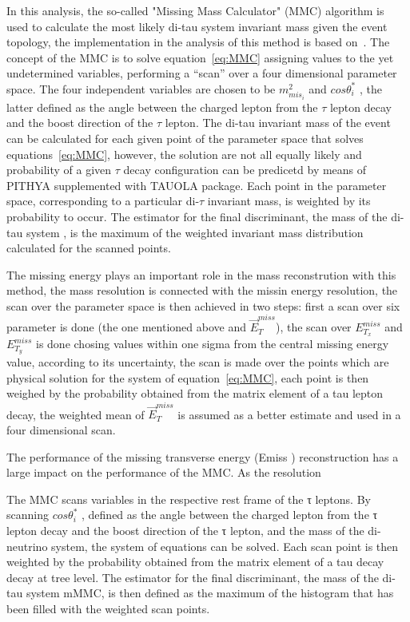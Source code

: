 In this analysis, the so-called "Missing Mass Calculator" (MMC) algorithm
is used to calculate the most likely di-tau system invariant mass given the event topology, %
the implementation in the analysis of this method is based on~\cite{MMC}. 
The concept of the MMC is to solve equation~\ref{eq:MMC} assigning values to the yet undetermined variables, performing a 
``scan'' over a four dimensional parameter space. The four independent  variables are chosen 
to be $ m^2_{mis_{i}}$ and $cos\theta^*_i$ , the latter defined
as the angle between the charged lepton from the $\tau$ lepton decay and the boost direction of the $\tau$ lepton. 
The di-tau invariant mass of the event can be calculated for each given point of the parameter space that solves equations~\ref{eq:MMC},
however, the solution are not all equally likely and probability of a given $\tau$ decay configuration can be predicetd by means
of PITHYA supplemented with TAUOLA package. Each point in the parameter space, corresponding
to a particular di-$\tau$ invariant mass, is weighted by its probability to occur. 
The estimator for the final discriminant, the mass of the di-tau system \mmc, 
is the maximum of the weighted invariant mass distribution calculated for the scanned points.

The missing energy plays an important role in the mass reconstrution with this method, the mass resolution is
connected with the missin energy resolution, the scan over the parameter space is then achieved in two steps:
first a scan over six parameter is done (the one mentioned above and $\vec{E}_T^{miss}$), the scan over $E_{T_x}^{miss}$ and $E_{T_y}^{miss}$
is done chosing values within one sigma from the central missing energy value, according to its uncertainty,
the scan is made over the points which are physical solution for the system of equation~\ref{eq:MMC}, each point 
is then weighed by the probability obtained from the matrix element of a tau lepton decay, the weighted 
mean of $\vec{E}_T^{miss}$ is assumed as a better estimate and used in a four dimensional scan. 


The performance of the missing transverse energy (Emiss
) reconstruction has a large impact on the
performance of the MMC. As the resolution

The MMC scans variables in the respective rest frame of the τ leptons. By scanning $cos\theta^*_i$ , defined
as the angle between the charged lepton from the τ lepton decay and the boost direction of the τ lepton,
and the mass of the di-neutrino system, the system of equations  can be solved. Each scan point is
then weighted by the probability obtained from the matrix element of a tau decay decay at tree
level. The estimator for the final discriminant, the mass of the di-tau system mMMC, is then defined as
the maximum of the histogram that has been filled with the weighted scan points.

